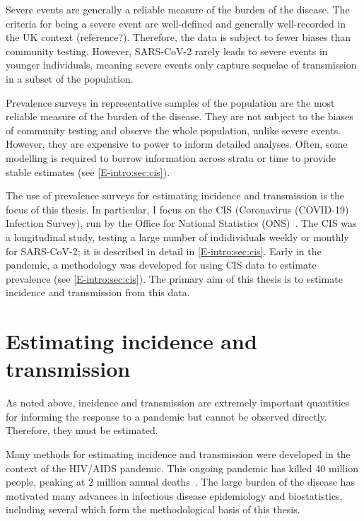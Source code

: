 \documentclass[thesis.tex]{subfiles}
\begin{document}
Severe events are generally a reliable measure of the burden of the disease.
The criteria for being a severe event are well-defined and generally well-recorded in the UK context (reference?).
Therefore, the data is subject to fewer biases than community testing.
However, SARS-CoV-2 rarely leads to severe events in younger individuals, meaning severe events only capture sequelae of transmission in a subset of the population.

Prevalence surveys in representative samples of the population are the most reliable measure of the burden of the disease.
They are not subject to the biases of community testing and observe the whole population, unlike severe events.
However, they are expensive to power to inform detailed analyses.
Often, some modelling is required to borrow information across strata or time to provide stable estimates (see \cref{E-intro:sec:cis}).

The use of prevalence surveys for estimating incidence and transmission is the focus of this thesis.
In particular, I focus on the CIS (Coronavirus (COVID-19) Infection Survey), run by the Office for National Statistics (ONS)~\autocite{CIS,cisMethodsONS}.
The CIS was a longitudinal study, testing a large number of indidividuals weekly or monthly for SARS-CoV-2; it is described in detail in \cref{E-intro:sec:cis}.
Early in the pandemic, a methodology was developed for using CIS data to estimate prevalence (see \cref{E-intro:sec:cis}).
The primary aim of this thesis is to estimate incidence and transmission from this data.

\section{Estimating incidence and transmission} \label{intro:sec:estimating-incidence}

As noted above, incidence and transmission are extremely important quantities for informing the response to a pandemic but cannot be observed directly.
Therefore, they must be estimated.

Many methods for estimating incidence and transmission were developed in the context of the HIV/AIDS pandemic.
This ongoing pandemic has killed 40 million people, peaking at 2 million annual deaths~\autocite{unaids2023}.
The large burden of the disease has motivated many advances in infectious disease epidemiology and biostatistics, including several which form the methodological basis of this thesis.
\end{document}
